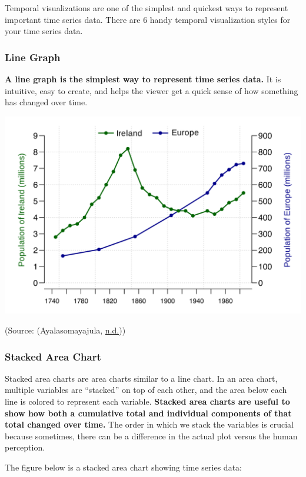 \documentclass[]{book}
\begin{document}
Temporal visualizations are one of the simplest and quickest ways to represent important time series data. There are 6 handy temporal visualization styles for your time series data.

\hypertarget{line-graph}{%
\subsubsection{Line Graph}\label{line-graph}}

\textbf{A line graph is the simplest way to represent time series data.} It is intuitive, easy to create, and helps the viewer get a quick sense of how something has changed over time.

\includegraphics{images/chapter5_line_graph.png}

(Source: (Ayalasomayajula, \protect\hyperlink{ref-socialcops}{n.d.}))

\hypertarget{stacked-area-chart}{%
\subsubsection{Stacked Area Chart}\label{stacked-area-chart}}

Stacked area charts are area charts similar to a line chart. In an area chart, multiple variables are ``stacked'' on top of each other, and the area below each line is colored to represent each variable. \textbf{Stacked area charts are useful to show how both a cumulative total and individual components of that total changed over time.} The order in which we stack the variables is crucial because sometimes, there can be a difference in the actual plot versus the human perception.

The figure below is a stacked area chart showing time series data:
\end{document}
